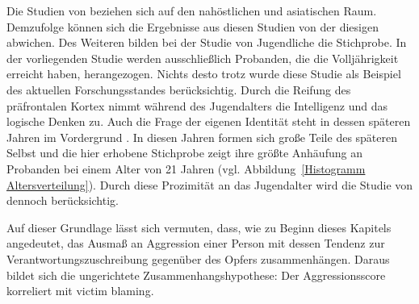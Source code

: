 Die Studien von \textcite{H1_malasia_2012, H1_moderation_2020} beziehen sich auf den nahöstlichen und asiatischen Raum. Demzufolge können sich die Ergebnisse aus diesen Studien von der diesigen abwichen. Des Weiteren bilden bei der Studie von \textcite{H1_malasia_2012} Jugendliche die Stichprobe. In der vorliegenden Studie werden ausschließlich Probanden, die die Volljährigkeit erreicht haben, herangezogen. Nichts desto trotz wurde diese Studie als Beispiel des aktuellen Forschungsstandes berücksichtig. Durch die Reifung des präfrontalen Kortex nimmt während des Jugendalters die Intelligenz und das logische Denken zu. Auch die Frage der eigenen Identität steht in dessen späteren Jahren im Vordergrund \parencite{H1_Entwicklung}. In diesen Jahren formen sich große Teile des späteren Selbst und die hier erhobene Stichprobe zeigt ihre größte Anhäufung an Probanden bei einem Alter von 21 Jahren (vgl. Abbildung~\ref{Histogramm Altersverteilung}). Durch diese Prozimität an das Jugendalter wird die Studie von \textcite{H1_malasia_2012} dennoch berücksichtig.

Auf dieser Grundlage lässt sich vermuten, dass, wie zu Beginn dieses Kapitels angedeutet, das Ausmaß an Aggression einer Person mit dessen Tendenz zur Verantwortungszuschreibung gegenüber des Opfers zusammenhängen. Daraus bildet sich die ungerichtete Zusammenhangshypothese: Der Aggressionsscore korreliert mit victim blaming.